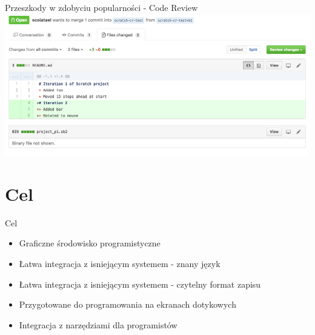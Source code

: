 \documentclass[presentation]{beamer}
\begin{document}
\begin{frame}[label=sec-1-8]{Przeszkody w zdobyciu popularności - Code Review}
\includegraphics[width=.9\linewidth]{./img/scratch-cr.png}
\end{frame}
\section{Cel}
\label{sec-2}
\begin{frame}[label=sec-2-1]{Cel}
\begin{itemize}
\item Graficzne środowisko programistyczne
\item Łatwa integracja z isniejącym systemem - znany język
\item Łatwa integracja z isniejącym systemem - czytelny format zapisu
\item Przygotowane do programowania na ekranach dotykowych
\item Integracja z narzędziami dla programistów
\end{itemize}
\end{frame}
\end{document}
